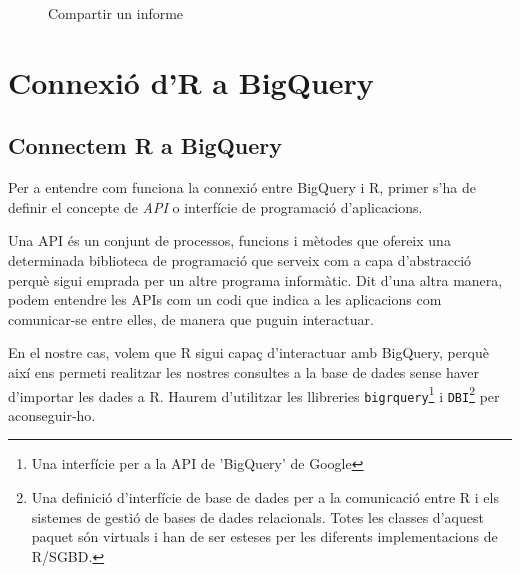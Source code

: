 \documentclass[11pt,longbibliography]{article}
\theoremstyle{definition}
\theoremstyle{remark}
\begin{document}
\begin{figure}[h!]
\par
{}%
\hfill
{}%
\par

\caption{Compartir un informe}
\label{fig:ds6}
\end{figure}

\newpage

\section{Connexió d'R a BigQuery}

\subsection{Connectem R a BigQuery}

Per a entendre com funciona la connexió entre BigQuery i R, primer s'ha de definir el concepte de \emph{API} o interfície de programació d'aplicacions.


Una API és un conjunt de processos, funcions i mètodes que ofereix una determinada biblioteca de programació que serveix com a capa d'abstracció perquè sigui emprada per un altre programa informàtic. Dit d'una altra manera, podem entendre les APIs com un codi que indica a les aplicacions com comunicar-se entre elles, de manera que puguin interactuar.


En el nostre cas, volem que R sigui capaç d'interactuar amb BigQuery, perquè així ens permeti realitzar les nostres consultes a la base de dades sense haver d'importar les dades a R. Haurem d'utilitzar les llibreries \texttt{bigrquery}\footnote{Una interfície per a la API de 'BigQuery' de Google} i \texttt{DBI}\footnote{Una definició d'interfície de base de dades per a la comunicació entre R i els sistemes de gestió de bases de dades relacionals. Totes les classes d'aquest paquet són virtuals i han de ser esteses per les diferents implementacions de R/SGBD.} per aconseguir-ho. 
\end{document}
